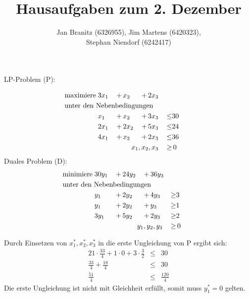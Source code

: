 \documentclass[10pt,a4paper,oneside,ngerman,numbers=noenddot]{scrartcl}
\begin{document}
\author{Jan Branitz (6326955), Jim Martens (6420323),\\
Stephan Niendorf (6242417)}
\title{Hausaufgaben zum 2. Dezember}
\maketitle
\section{} %
	\subsection{} %
		LP-Problem (P):
		
		\begin{alignat*}{4}
			\text{maximiere}\; & 3x_{1} \,&+&\, x_{2} \,&+&\, 2x_{3} && \\
			\multicolumn{8}{l}{\text{unter den Nebenbedingungen}} && \\
			\;& x_{1} \,&+&\, x_{2} \,&+&\, 3x_{3} \,&\leq & 30 \\
			\;& 2x_{1} \,&+&\, 2x_{2} \,&+&\, 5x_{3} \,&\leq & 24 \\
			\;& 4x_{1} \,&+&\, x_{2} \,&+&\, 2x_{3} \,&\leq & 36 \\
			\multicolumn{6}{r}{$x_{1}, x_{2}, x_{3}$} \,&\geq &\, 0
		\end{alignat*}
		Duales Problem (D):
		\begin{alignat*}{4}
			\text{minimiere}\; & 30y_{1} \,&+&\, 24y_{2} \,&+&\, 36y_{3} && \\
			\multicolumn{8}{l}{\text{unter den Nebenbedingungen}} && \\
			\;& y_{1} \,&+&\, 2y_{2} \,&+&\, 4y_{3} \,&\geq & 3 \\
			\;& y_{1} \,&+&\, 2y_{2} \,&+&\, y_{3} \,&\geq & 1 \\
			\;& 3y_{1} \,&+&\, 5y_{2} \,&+&\, 2y_{3} \,&\geq & 2 \\
			\multicolumn{6}{r}{$y_{1}, y_{2}, y_{3}$} \,&\geq &\, 0
		\end{alignat*}
		
		Durch Einsetzen von $x_{1}^{*}, x_{2}^{*}, x_{3}^{*}$ in die erste Ungleichung von P ergibt sich:
		\begin{alignat*}{2}
			1 \cdot \frac{33}{4} + 1 \cdot 0 + 3 \cdot \frac{3}{2} &\leq & 30 \\
			\frac{33}{4} + \frac{18}{4} &\leq & 30 \\
			\frac{51}{4} &\leq & \frac{120}{4}
		\end{alignat*}
		Die erste Ungleichung ist nicht mit Gleichheit erfüllt, somit muss $y_{1}^{*} = 0$ gelten.
		
\end{document}
